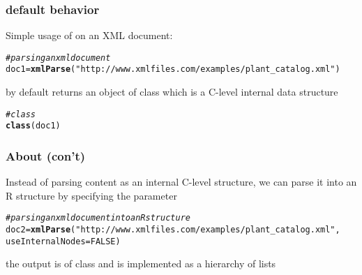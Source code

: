 \documentclass[12pt]{beamer}\usepackage[]{graphicx}\usepackage[]{color}
\makeatletter
\newcommand{\hlnum}[1]{\textcolor[rgb]{0.686,0.059,0.569}{#1}}%
\newcommand{\hlstr}[1]{\textcolor[rgb]{0.192,0.494,0.8}{#1}}%
\newcommand{\hlcom}[1]{\textcolor[rgb]{0.678,0.584,0.686}{\textit{#1}}}%
\newcommand{\hlstd}[1]{\textcolor[rgb]{0.345,0.345,0.345}{#1}}%
\newcommand{\hlkwb}[1]{\textcolor[rgb]{0.69,0.353,0.396}{#1}}%
\newcommand{\hlkwc}[1]{\textcolor[rgb]{0.333,0.667,0.333}{#1}}%
\newcommand{\hlkwd}[1]{\textcolor[rgb]{0.737,0.353,0.396}{\textbf{#1}}}%
\newenvironment{kframe}{%
 \def\at@end@of@kframe{}%
 \ifinner\ifhmode%
  \def\at@end@of@kframe{\end{minipage}}%
  \begin{minipage}{\columnwidth}%
 \fi\fi%
 \def\FrameCommand##1{\hskip\@totalleftmargin \hskip-\fboxsep
 \colorbox{shadecolor}{##1}\hskip-\fboxsep
     \hskip-\linewidth \hskip-\@totalleftmargin \hskip\columnwidth}%
 \MakeFramed {\advance\hsize-\width
   \@totalleftmargin\z@ \linewidth\hsize
   \@setminipage}}%
 {\par\unskip\endMakeFramed%
 \at@end@of@kframe}
\newenvironment{knitrout}{}{} %
\makeatother
\begin{document}

\begin{frame}[fragile]
\frametitle{ default behavior}

Simple usage of  on an XML document:
\begin{knitrout}\scriptsize
{}\color{fgcolor}\begin{kframe}
\begin{alltt}
\hlcom{# parsing an xml document}
\hlstd{doc1} \hlkwb{=} \hlkwd{xmlParse}\hlstd{(}\hlstr{"http://www.xmlfiles.com/examples/plant_catalog.xml"}\hlstd{)}
\end{alltt}
\end{kframe}
\end{knitrout}

by default  returns an object of class {\hilit {}} which is a C-level internal data structure

\begin{knitrout}\footnotesize
{}\color{fgcolor}\begin{kframe}


{\ttfamily\noindent\bfseries\color{errorcolor}{\#\# Error: XML content does not seem to be XML: '../plant\_catalog.xml'}}\begin{alltt}
\hlcom{# class }
\hlkwd{class}\hlstd{(doc1)}
\end{alltt}


{\ttfamily\noindent\bfseries\color{errorcolor}{\#\# Error in eval(expr, envir, enclos): object 'doc1' not found}}\end{kframe}
\end{knitrout}

\end{frame}


\begin{frame}[fragile]
\frametitle{About  (con't)}

Instead of parsing content as an internal C-level structure, we can parse it into an R structure by specifying the parameter {\hilit {}}
\eb
\begin{knitrout}\scriptsize
{}\color{fgcolor}\begin{kframe}
\begin{alltt}
\hlcom{# parsing an xml document into an R structure}
\hlstd{doc2} \hlkwb{=} \hlkwd{xmlParse}\hlstd{(}\hlstr{"http://www.xmlfiles.com/examples/plant_catalog.xml"}\hlstd{,}
                \hlkwc{useInternalNodes} \hlstd{=} \hlnum{FALSE}\hlstd{)}
\end{alltt}
\end{kframe}
\end{knitrout}

the output is of class {\hilit {}} and is implemented as a hierarchy of lists

\end{frame}
\end{document}
